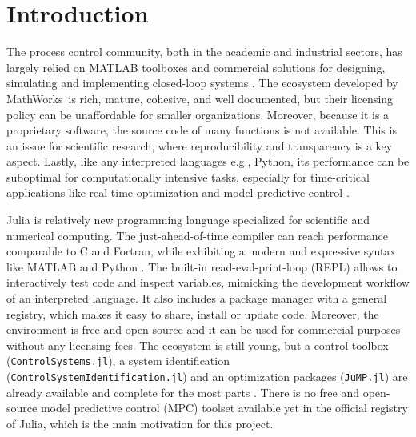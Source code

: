 \section{Introduction}

The process control community, both in the academic and industrial sectors, has largely relied on MATLAB toolboxes and commercial solutions for designing, simulating and implementing closed-loop systems \citep{mpcSurvey, optimMatlab}. The ecosystem developed by MathWorks\texttrademark\ is rich, mature, cohesive, and well documented, but their licensing policy can be unaffordable for smaller organizations. Moreover, because it is a proprietary software, the source code of many functions is not available. This is an issue for scientific research, where reproducibility and transparency is a key aspect. Lastly, like any interpreted languages e.g., Python, its performance can be suboptimal for computationally intensive tasks, especially for time-critical applications like real time optimization and model predictive control \citep{matlabPythonJulia, juliaML}.

Julia is relatively new programming language specialized for scientific and numerical computing. The just-ahead-of-time compiler can reach performance comparable to C and Fortran, while exhibiting a modern and expressive syntax like MATLAB and Python \citep{juliaPaper}. The built-in read-eval-print-loop (REPL) allows to interactively test code and inspect variables, mimicking the development workflow of an interpreted language. It also includes a package manager with a general registry, which makes it easy to share, install or update code. Moreover, the environment is free and open-source and it can be used for commercial purposes without any licensing fees. The ecosystem is still young, but a control toolbox (\texttt{ControlSystems.jl}), a system identification (\texttt{ControlSystemIdentification.jl}) and an optimization packages (\texttt{JuMP.jl}) are already available and complete for the most parts \citep{controlsystems, jump}. There is no free and open-source model predictive control (MPC) toolset available yet in the official registry of Julia, which is the main motivation for this project.


